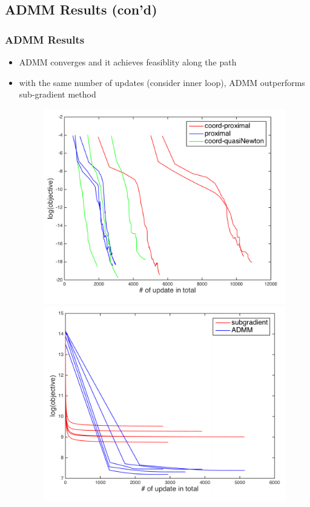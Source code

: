 \documentclass{beamer}
\begin{document}
\subsection{ADMM Results (con'd)}
\begin{frame}
\frametitle{ADMM Results}
\begin{itemize}
  \item ADMM converges and it achieves feasiblity along the path
  \item with the same number of updates (consider inner loop), ADMM outperforms sub-gradient method
  \begin{figure}[htbp]
  \centering
  \begin{minipage}{0.35\textwidth}
    \centering
    \includegraphics[width=1\textwidth]{images/feasibility}
  \end{minipage}
  \hfill
  \begin{minipage}{0.35\textwidth}
    \centering
    \includegraphics[width=1\textwidth]{images/subgrad}
  \end{minipage}
  \end{figure}
\end{itemize}
\end{frame}
\end{document}
